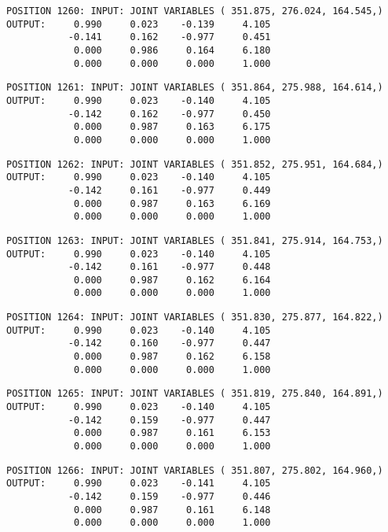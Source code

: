 \begin{verbatim}
POSITION 1260: INPUT: JOINT VARIABLES ( 351.875, 276.024, 164.545,)
OUTPUT:     0.990     0.023    -0.139     4.105
           -0.141     0.162    -0.977     0.451
            0.000     0.986     0.164     6.180
            0.000     0.000     0.000     1.000
\end{verbatim} \pagebreak[1]\begin{verbatim}
POSITION 1261: INPUT: JOINT VARIABLES ( 351.864, 275.988, 164.614,)
OUTPUT:     0.990     0.023    -0.140     4.105
           -0.142     0.162    -0.977     0.450
            0.000     0.987     0.163     6.175
            0.000     0.000     0.000     1.000
\end{verbatim} \pagebreak[1]\begin{verbatim}
POSITION 1262: INPUT: JOINT VARIABLES ( 351.852, 275.951, 164.684,)
OUTPUT:     0.990     0.023    -0.140     4.105
           -0.142     0.161    -0.977     0.449
            0.000     0.987     0.163     6.169
            0.000     0.000     0.000     1.000
\end{verbatim} \pagebreak[1]\begin{verbatim}
POSITION 1263: INPUT: JOINT VARIABLES ( 351.841, 275.914, 164.753,)
OUTPUT:     0.990     0.023    -0.140     4.105
           -0.142     0.161    -0.977     0.448
            0.000     0.987     0.162     6.164
            0.000     0.000     0.000     1.000
\end{verbatim} \pagebreak[1]\begin{verbatim}
POSITION 1264: INPUT: JOINT VARIABLES ( 351.830, 275.877, 164.822,)
OUTPUT:     0.990     0.023    -0.140     4.105
           -0.142     0.160    -0.977     0.447
            0.000     0.987     0.162     6.158
            0.000     0.000     0.000     1.000
\end{verbatim} \pagebreak[1]\begin{verbatim}
POSITION 1265: INPUT: JOINT VARIABLES ( 351.819, 275.840, 164.891,)
OUTPUT:     0.990     0.023    -0.140     4.105
           -0.142     0.159    -0.977     0.447
            0.000     0.987     0.161     6.153
            0.000     0.000     0.000     1.000
\end{verbatim} \pagebreak[1]\begin{verbatim}
POSITION 1266: INPUT: JOINT VARIABLES ( 351.807, 275.802, 164.960,)
OUTPUT:     0.990     0.023    -0.141     4.105
           -0.142     0.159    -0.977     0.446
            0.000     0.987     0.161     6.148
            0.000     0.000     0.000     1.000
\end{verbatim} \pagebreak[1]\begin{verbatim}

\end{verbatim}
